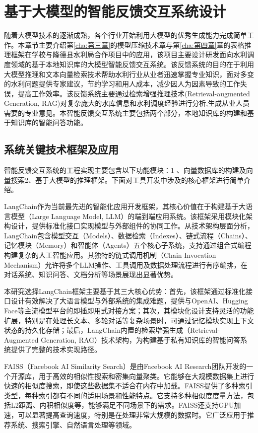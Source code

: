 \chapter{基于大模型的智能反馈交互系统设计}
\label{cha:第五章}

随着大模型技术的逐渐成熟，各个行业开始利用大模型的优秀生成能力完成简单工作。本章节主要介绍第\ref{cha:第三章}的模型压缩技术章与第\ref{cha:第四章}章的表格推理框架在学校与隆德县水利局合作项目中的应用，该项目主要设计研发面向水利调度领域的基于本地知识库的大模型智能反馈交互系统。该反馈系统的目的在于利用大模型推理和文本向量检索技术帮助水利行业从业者迅速掌握专业知识，面对多变的水利问题提供专家建议，节约学习和用人成本，减少因人为因素导致的工作失误，提高工作效率。该反馈系统主要通过检索增强推理技术(Retrieval-augmented Generation, RAG)对复杂庞大的水库信息和水利调度经验进行分析,生成从业人员需要的专业意见。本智能反馈交互系统主要包括两个部分，本地知识库的构建和基于知识库的智能问答功能。
\section{系统关键技术框架及应用}

智能反馈交互系统的工程实现主要包含以下功能模块：1 、向量数据库的构建及向量搜索2、基于大模型的推理框架。下面对工具开发中涉及的核心框架进行简单介绍。

LangChain作为当前最先进的智能化应用开发框架，其核心价值在于构建基于大语言模型（Large Language Model, LLM）的端到端应用系统。该框架采用模块化架构设计，提供标准化接口实现模型与外部组件的协同工作。从技术架构层面分析，LangChain包含模型交互（Models）、数据检索（Indexes）、链式流程（Chains）、记忆模块（Memory）和智能体（Agents）五个核心子系统，支持通过组合式编程构建复杂的人工智能应用。其独特的链式调用机制（Chain Invocation Mechanism）允许将多个LLM操作、工具调用及数据处理流程进行有序编排，在对话系统、知识问答、文档分析等场景展现出显著优势。

本研究选择LangChain框架主要基于其三大核心优势：首先，该框架通过标准化接口设计有效解决了大语言模型与外部系统的集成难题，提供与OpenAI、Hugging Face等主流模型平台的即插即用式对接方案；其次，其模块化设计支持灵活的功能扩展，特别是在处理长文本、多轮对话等复杂场景时，可通过记忆模块实现上下文状态的持久化存储；最后，LangChain内置的检索增强生成（Retrieval-Augmented Generation, RAG）技术架构，为构建基于私有知识库的智能问答系统提供了完整的技术实现路径。

FAISS\cite{johnson2019billion}（Facebook AI Similarity Search）是由Facebook AI Research团队开发的一个开源库，用于高效的相似性搜索和密集向量聚类。它能够在大规模数据集上进行快速的相似度搜索，即使这些数据集不适合在内存中加载。FAISS提供了多种索引类型，每种索引都有不同的适用场景和性能特点。它支持多种相似度度量方法，包括L2距离、内积相似度等，能够满足不同场景下的需求。FAISS还支持GPU加速，可以显著提高查询速度，特别是在处理非常大规模的数据时。它广泛应用于推荐系统、搜索引擎、自然语言处理等领域。

